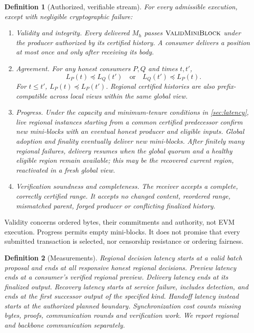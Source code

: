 \documentclass[11pt,a4paper,onecolumn]{article}
\newcommand{\pre}{\preceq}
\newcommand{\Proc}[1]{\textnormal{\textsc{#1}}}
\newtheorem{definition}{Definition}[section]
\theoremstyle{remark}\newtheorem{example}[definition]{Example}
\begin{document}
\begin{definition}[Authorized, verifiable stream]\label{def:service}
For every admissible execution, except with negligible cryptographic failure:
\begin{enumerate}[label=\textnormal{(\roman*)}]
\item \emph{Validity and integrity.} Every delivered $M_h$ passes
$\Proc{ValidMiniBlock}$ under the producer authorized by its certified history.
A consumer delivers a position at most once and only after receiving its body.
\item \emph{Agreement.} For any honest consumers $P,Q$ and times $t,t'$,
\[
 L_P(t)\pre L_Q(t')\quad\text{or}\quad L_Q(t')\pre L_P(t).
\]
For $t\leq t'$, $L_P(t)\pre L_P(t')$. Regional certified histories are also
prefix-compatible across local views within the same global view.
\item \emph{Progress.} Under the capacity and minimum-tenure conditions in
\cref{sec:latency}, live regional instances starting from a common certified
predecessor confirm new mini-blocks with an eventual honest producer and
eligible inputs. Global adoption and finality eventually deliver new mini-blocks.
After finitely many regional failures, delivery resumes when the global quorum
and a healthy eligible region remain available; this may be the recovered
current region, reactivated in a fresh global view.
\item \emph{Verification soundness and completeness.} The receiver accepts a
complete, correctly certified range. It accepts no changed content, reordered
range, mismatched parent, forged producer or conflicting finalized history.
\end{enumerate}
\end{definition}
Validity concerns ordered bytes, their commitments and authority, not EVM
execution. Progress permits empty mini-blocks. It does not promise that every
submitted transaction is selected, nor censorship resistance or ordering fairness.

\begin{definition}[Measurements]\label{def:metrics}
Regional decision latency starts at a valid batch proposal and ends at all
responsive honest regional decisions. Preview latency ends at a consumer's
verified regional preview. Delivery latency ends at its finalized output.
Recovery latency starts at service failure, includes detection, and ends at
the first successor output of the specified kind. Handoff latency instead starts
at the authorized planned boundary. Synchronization cost counts missing bytes,
proofs, communication rounds and verification work. We report regional and
backbone communication separately.
\end{definition}
\end{document}
